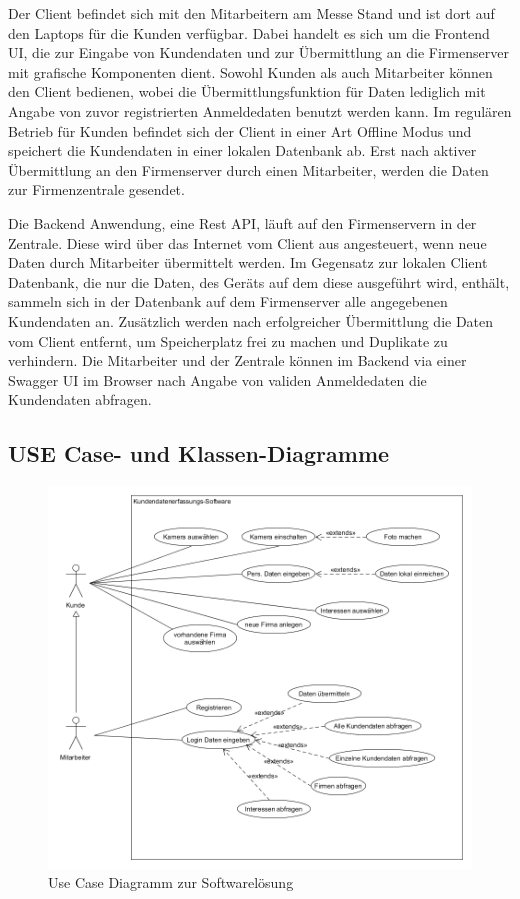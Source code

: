 Der Client befindet sich mit den Mitarbeitern am Messe Stand und ist dort auf den Laptops für die Kunden verfügbar. Dabei handelt es sich um die Frontend UI, die zur Eingabe von Kundendaten und zur Übermittlung an die Firmenserver mit grafische Komponenten dient. Sowohl Kunden als auch Mitarbeiter können den Client bedienen, wobei die Übermittlungsfunktion für Daten lediglich mit Angabe von zuvor registrierten Anmeldedaten benutzt werden kann. Im regulären Betrieb für Kunden befindet sich der Client in einer Art Offline Modus und speichert die Kundendaten in einer lokalen Datenbank ab. Erst nach aktiver Übermittlung an den Firmenserver durch einen Mitarbeiter, werden die Daten zur Firmenzentrale gesendet.

Die Backend Anwendung, eine Rest API, läuft auf den Firmenservern in der Zentrale. Diese wird über das Internet vom Client aus angesteuert, wenn neue Daten durch Mitarbeiter übermittelt werden. Im Gegensatz zur lokalen Client Datenbank, die nur die Daten, des Geräts auf dem diese ausgeführt wird, enthält, sammeln sich in der Datenbank auf dem Firmenserver alle angegebenen Kundendaten an. Zusätzlich werden nach erfolgreicher Übermittlung die Daten vom Client entfernt, um Speicherplatz frei zu machen und Duplikate zu verhindern. Die Mitarbeiter und der Zentrale können im Backend via einer Swagger UI im Browser nach Angabe von validen Anmeldedaten die Kundendaten abfragen.

\newpage
\subsection{USE Case- und Klassen-Diagramme}

\begin{figure}[h]
	\centering
	\includegraphics[width=\linewidth]{Images/Projekt_Messe_UseCase2}
	\caption{Use Case Diagramm zur Softwarelösung}
	\label{fig:projektmesseusecase}
\end{figure}

